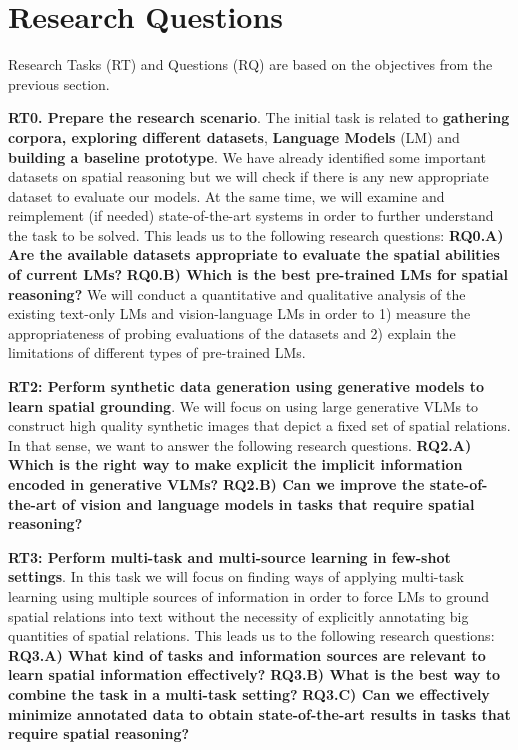 \section{Research Questions}

Research Tasks (RT) and Questions (RQ) are based on the objectives from the previous section.

\textbf{RT0. Prepare the research scenario}. The initial task is related to \textbf{gathering corpora, exploring different datasets}, \textbf{Language Models} (LM) and \textbf{building a baseline prototype}. We have already identified some important datasets on spatial reasoning but we will check if there is any new appropriate dataset to evaluate our models. At the same time, we will examine and reimplement (if needed) state-of-the-art systems in order to further understand the task to be solved. This leads us to the following research questions: \textbf{RQ0.A) Are the available datasets appropriate to evaluate the spatial abilities of current LMs?} \textbf{RQ0.B) Which is the best pre-trained LMs for spatial reasoning?} We will conduct a quantitative and qualitative analysis of the existing text-only LMs and vision-language LMs in order to 1) measure the appropriateness of probing evaluations of the datasets and 2) explain the limitations of different types of pre-trained LMs.

\textbf{RT2: Perform synthetic data generation using generative models to learn spatial grounding}. We will focus on using large generative VLMs to construct high quality synthetic images that depict a fixed set of spatial relations. In that sense, we want to answer the following research questions. \textbf{RQ2.A) Which is the right way to make explicit the implicit information encoded in generative VLMs?} \textbf{RQ2.B) Can we improve the state-of-the-art of vision and language models in tasks that require spatial reasoning?}

\textbf{RT3: Perform multi-task and multi-source learning in few-shot settings}. In this task we will focus on finding ways of applying multi-task learning using multiple sources of information in order to force LMs to ground spatial relations into text without the necessity of explicitly annotating big quantities of spatial relations. This leads us to the following research questions: \textbf{RQ3.A) What kind of tasks and information sources are relevant to learn spatial information effectively?} \textbf{RQ3.B) What is the best way to combine the task in a multi-task setting?} \textbf{RQ3.C) Can we effectively minimize annotated data to obtain state-of-the-art results in tasks that require spatial reasoning?}

